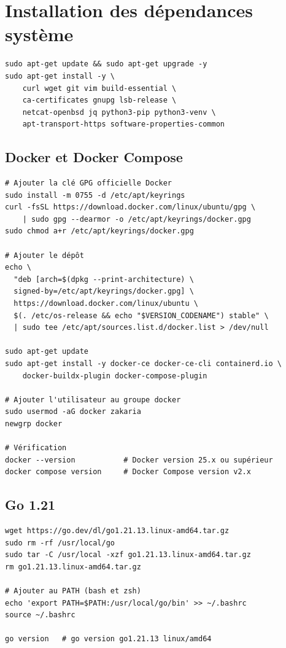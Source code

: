 \documentclass[12pt,a4paper,french]{article}
\begin{document}
\section{Installation des dépendances système}

\begin{lstlisting}[style=bash, caption={Mise à jour et paquets de base}]
sudo apt-get update && sudo apt-get upgrade -y
sudo apt-get install -y \
    curl wget git vim build-essential \
    ca-certificates gnupg lsb-release \
    netcat-openbsd jq python3-pip python3-venv \
    apt-transport-https software-properties-common
\end{lstlisting}

\subsection{Docker et Docker Compose}

\begin{lstlisting}[style=bash, caption={Installation Docker CE}]
# Ajouter la clé GPG officielle Docker
sudo install -m 0755 -d /etc/apt/keyrings
curl -fsSL https://download.docker.com/linux/ubuntu/gpg \
    | sudo gpg --dearmor -o /etc/apt/keyrings/docker.gpg
sudo chmod a+r /etc/apt/keyrings/docker.gpg

# Ajouter le dépôt
echo \
  "deb [arch=$(dpkg --print-architecture) \
  signed-by=/etc/apt/keyrings/docker.gpg] \
  https://download.docker.com/linux/ubuntu \
  $(. /etc/os-release && echo "$VERSION_CODENAME") stable" \
  | sudo tee /etc/apt/sources.list.d/docker.list > /dev/null

sudo apt-get update
sudo apt-get install -y docker-ce docker-ce-cli containerd.io \
    docker-buildx-plugin docker-compose-plugin

# Ajouter l'utilisateur au groupe docker
sudo usermod -aG docker zakaria
newgrp docker

# Vérification
docker --version           # Docker version 25.x ou supérieur
docker compose version     # Docker Compose version v2.x
\end{lstlisting}

\subsection{Go 1.21}

\begin{lstlisting}[style=bash, caption={Installation Go pour la compilation du chaincode}]
wget https://go.dev/dl/go1.21.13.linux-amd64.tar.gz
sudo rm -rf /usr/local/go
sudo tar -C /usr/local -xzf go1.21.13.linux-amd64.tar.gz
rm go1.21.13.linux-amd64.tar.gz

# Ajouter au PATH (bash et zsh)
echo 'export PATH=$PATH:/usr/local/go/bin' >> ~/.bashrc
source ~/.bashrc

go version   # go version go1.21.13 linux/amd64
\end{lstlisting}
\end{document}
